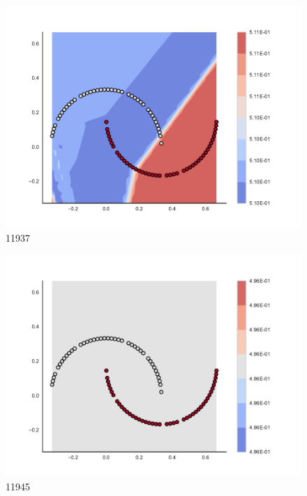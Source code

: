 \begin{subfigure}[b]{0.09\textwidth}
    \includegraphics[clip, trim=2.35cm 1.75cm 4.5cm 0cm,width=\textwidth]{img/convergence/11937.pdf}
    \caption{11937}
    \label{fig:convergence_11937}
\end{subfigure}
%
\begin{subfigure}[b]{0.09\textwidth}
    \includegraphics[clip, trim=2.35cm 1.75cm 4.5cm 0cm,width=\textwidth]{img/convergence/11945.pdf}
    \caption{11945}
    \label{fig:convergence_11945}
\end{subfigure}
%
